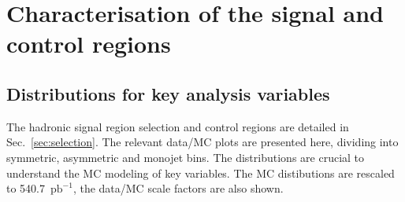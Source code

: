 \section{Characterisation of the signal and control regions}
\label{sec:yields}

\subsection{Distributions for key analysis variables \label{sec:mc-data-comp}}

The hadronic signal region selection and control regions are detailed in Sec.~\ref{sec:selection}. The relevant data/MC plots are presented here, dividing into symmetric, asymmetric and monojet bins. The distributions are crucial to understand the MC modeling of key variables. The MC distibutions are rescaled to 540.7~$\text{pb}^{-1}$, the data/MC scale factors are also shown.
